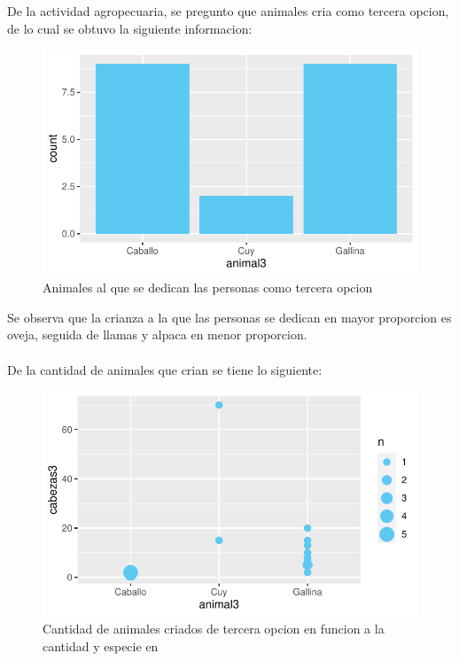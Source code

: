 \documentclass[12pt]{article}\usepackage[]{graphicx}\usepackage[]{xcolor}
\makeatletter
\def\maxwidth{ %
  \ifdim\Gin@nat@width>\linewidth
    \linewidth
  \else
    \Gin@nat@width
  \fi
}
\newenvironment{knitrout}{}{} %
\makeatother
\begin{document}
	
	De la actividad agropecuaria, se pregunto que animales cria como tercera opcion, de lo cual se obtuvo la siguiente informacion:
	\begin{figure}[H]
	\centering
\begin{knitrout}
\color{fgcolor}
\includegraphics[width=\maxwidth]{figure/twenty_one-1} 
\end{knitrout}
	\caption{Animales al que se dedican las personas como tercera opcion}
	\end{figure}
	Se observa que la crianza a la que las personas se dedican en mayor proporcion es oveja, seguida de llamas y alpaca en menor proporcion.\\
	\\
	De la cantidad de animales que crian se tiene lo siguiente:
	\begin{figure}[H]
	\centering
\begin{knitrout}
\color{fgcolor}
\includegraphics[width=\maxwidth]{figure/twenty_two-1} 
\end{knitrout}
	\caption{Cantidad de animales criados de tercera opcion en funcion a la cantidad y especie en \comunidad}
	\end{figure}
\end{document}
